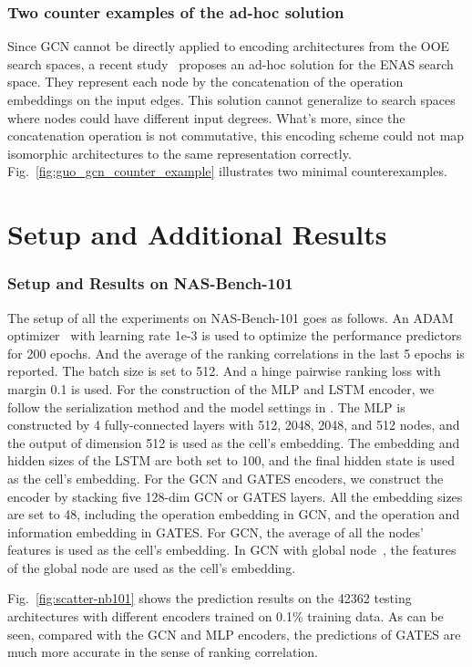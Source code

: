 \documentclass[runningheads]{llncs}
\begin{document}
\subsubsection{Two counter examples of the ad-hoc solution~\cite{guo2019nat}}
Since GCN cannot be directly applied to encoding architectures from the OOE search spaces, a recent study~\cite{guo2019nat} proposes an ad-hoc solution for the ENAS search space. They represent each node by the concatenation of the operation embeddings on the input edges. This solution cannot generalize to search spaces where nodes could have different input degrees. What’s more, since the concatenation operation is not commutative, this encoding scheme could not map isomorphic architectures to the same representation correctly. Fig.~\ref{fig:guo_gcn_counter_example} illustrates two minimal counterexamples.

\section{Setup and Additional Results}

\subsubsection{Setup and Results on NAS-Bench-101}
The setup of all the experiments on NAS-Bench-101 goes as follows. An ADAM optimizer~\cite{kingma2014adam} with learning rate 1e-3 is used to optimize the performance predictors for 200 epochs. And the average of the ranking correlations in the last 5 epochs is reported. The batch size is set to 512. And a hinge pairwise ranking loss with margin 0.1 is used. For the construction of the MLP and LSTM encoder, we follow the serialization method and the model settings in \cite{wang2018alphax}. The MLP is constructed by 4 fully-connected layers with 512, 2048, 2048, and 512 nodes, and the output of dimension 512 is used as the cell's embedding. The embedding and hidden sizes of the LSTM are both set to 100, and the final hidden state is used as the cell's embedding. For the GCN and GATES encoders, we construct the encoder by stacking five 128-dim GCN or GATES layers. 
All the embedding sizes are set to 48, including the operation embedding in GCN, and the operation and information embedding in GATES. For GCN, the average of all the nodes' features is used as the cell's embedding. In GCN with global node~\cite{shi2019multi}, the features of the global node are used as the cell's embedding.

Fig.~\ref{fig:scatter-nb101} shows the prediction results on the 42362 testing architectures with different encoders trained on 0.1\% training data.
As can be seen, compared with the GCN and MLP encoders, the predictions of GATES are much more accurate in the sense of ranking correlation.
\end{document}
